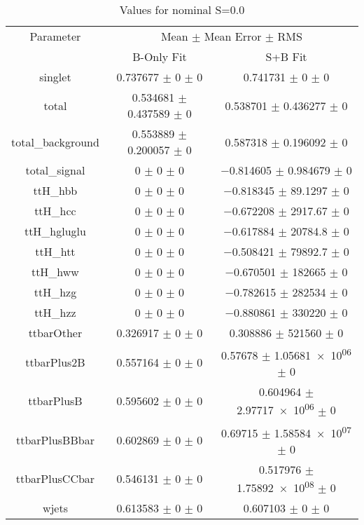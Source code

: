 \begin{table}
\centering
\caption{Values for nominal S=0.0}
\begin{tabular}{ccc}
\toprule
Parameter & \multicolumn{2}{c}{Mean $\pm$ Mean Error $\pm$ RMS}\\
 & B-Only Fit & S+B Fit\\
\midrule
singlet & \num{0.737677} $\pm$ \num{0} $\pm$ \num{0} & \num{0.741731} $\pm$ \num{0} $\pm$ \num{0}\\
total & \num{0.534681} $\pm$ \num{0.437589} $\pm$ \num{0} & \num{0.538701} $\pm$ \num{0.436277} $\pm$ \num{0}\\
total\_background & \num{0.553889} $\pm$ \num{0.200057} $\pm$ \num{0} & \num{0.587318} $\pm$ \num{0.196092} $\pm$ \num{0}\\
total\_signal & \num{0} $\pm$ \num{0} $\pm$ \num{0} & \num{-0.814605} $\pm$ \num{0.984679} $\pm$ \num{0}\\
ttH\_hbb & \num{0} $\pm$ \num{0} $\pm$ \num{0} & \num{-0.818345} $\pm$ \num{89.1297} $\pm$ \num{0}\\
ttH\_hcc & \num{0} $\pm$ \num{0} $\pm$ \num{0} & \num{-0.672208} $\pm$ \num{2917.67} $\pm$ \num{0}\\
ttH\_hgluglu & \num{0} $\pm$ \num{0} $\pm$ \num{0} & \num{-0.617884} $\pm$ \num{20784.8} $\pm$ \num{0}\\
ttH\_htt & \num{0} $\pm$ \num{0} $\pm$ \num{0} & \num{-0.508421} $\pm$ \num{79892.7} $\pm$ \num{0}\\
ttH\_hww & \num{0} $\pm$ \num{0} $\pm$ \num{0} & \num{-0.670501} $\pm$ \num{182665} $\pm$ \num{0}\\
ttH\_hzg & \num{0} $\pm$ \num{0} $\pm$ \num{0} & \num{-0.782615} $\pm$ \num{282534} $\pm$ \num{0}\\
ttH\_hzz & \num{0} $\pm$ \num{0} $\pm$ \num{0} & \num{-0.880861} $\pm$ \num{330220} $\pm$ \num{0}\\
ttbarOther & \num{0.326917} $\pm$ \num{0} $\pm$ \num{0} & \num{0.308886} $\pm$ \num{521560} $\pm$ \num{0}\\
ttbarPlus2B & \num{0.557164} $\pm$ \num{0} $\pm$ \num{0} & \num{0.57678} $\pm$ \num{1.05681e+06} $\pm$ \num{0}\\
ttbarPlusB & \num{0.595602} $\pm$ \num{0} $\pm$ \num{0} & \num{0.604964} $\pm$ \num{2.97717e+06} $\pm$ \num{0}\\
ttbarPlusBBbar & \num{0.602869} $\pm$ \num{0} $\pm$ \num{0} & \num{0.69715} $\pm$ \num{1.58584e+07} $\pm$ \num{0}\\
ttbarPlusCCbar & \num{0.546131} $\pm$ \num{0} $\pm$ \num{0} & \num{0.517976} $\pm$ \num{1.75892e+08} $\pm$ \num{0}\\
wjets & \num{0.613583} $\pm$ \num{0} $\pm$ \num{0} & \num{0.607103} $\pm$ \num{0} $\pm$ \num{0}\\
\bottomrule
\end{tabular}
\end{table}
